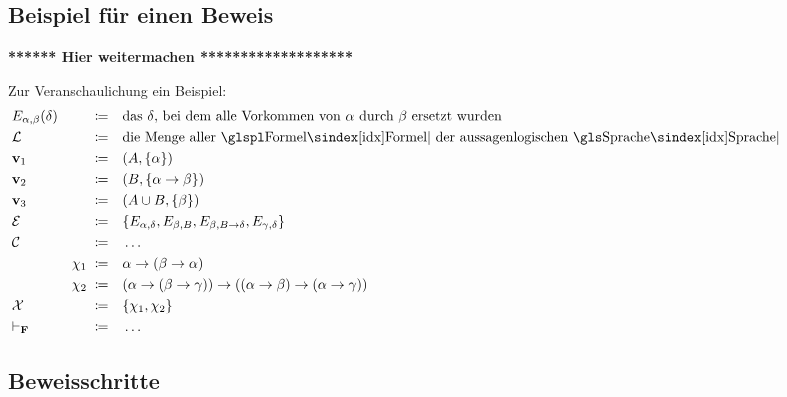 \subsection{Beispiel für einen Beweis}%
\label{sub:Beispielbeweis}

\textbf{****** Hier weitermachen *******************}%

Zur Veranschaulichung ein Beispiel:
\begin{align}
	& \substitution_{\alpha,\beta}(\delta) & \defeq \quad & \text{das }\delta \text{, bei dem alle Vorkommen von $\alpha$ durch $\beta$ ersetzt wurden} \\
	& \formulaSet        & \defeq \quad & \text{die Menge aller \Formeln\ der aussagenlogischen \Sprache} \\
	& \prerequisite_1    & \defeq \quad & (A, \{\alpha\}) \\
	& \prerequisite_2    & \defeq \quad & (B, \{\alpha \limp \beta\}) \\
	& \prerequisite_3    & \defeq \quad & (A \cup B, \{\beta\}) \\
	& \substitutionSet   & \defeq \quad & \{\substitution_{\alpha,\delta}, \substitution_{\beta,B}, \substitution_{\beta,B\limp \delta}, \substitution_{\gamma,\delta} \} \\
	& \conclusionruleSet & \defeq \quad & \dots \\
	&          & \chi_1 \; \defeq \quad & \alpha \limp (\beta \limp \alpha) \\
	&          & \chi_2 \; \defeq \quad & (\alpha \limp (\beta \limp \gamma)) \limp ((\alpha \limp \beta) \limp (\alpha \limp \gamma)) \\
	& \axiomSet          & \defeq \quad & \{\chi_1, \chi_2\} \\
	& \conclusionrel     & \defeq \quad & \dots
	\formulatoleft
\end{align}

\subsection{Beweisschritte}%
\label{sub:Beweisschritte}

